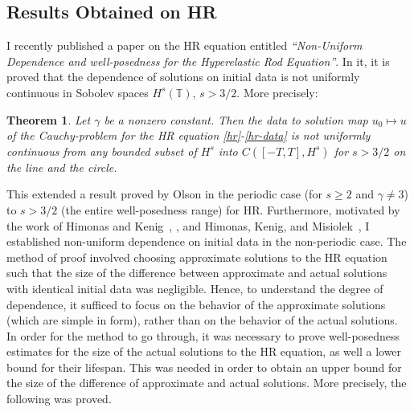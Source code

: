 \documentclass[12pt,reqno]{amsart}
\newcommand{\ci}{\mathbb{T}}
\newtheorem{theorem}{Theorem}
\begin{document}
%
%
\subsection{Results Obtained on HR} 
\label{ssec:weak-disp}
%
%
%
%
%
%
%
%
%
%
I recently published a paper on the HR equation entitled 
{\it ``Non-Uniform Dependence and well-posedness
for the
Hyperelastic Rod Equation''}. 
In it, it is proved that the dependence of
solutions on initial data is not uniformly continuous in Sobolev spaces
$H^s(\ci)$, $s>3/2$.  More precisely: 
\begin{theorem}
\label{hr-non-unif-dependence}
Let $\gamma$ be a nonzero constant. Then 
the data to solution map $u_{0} \mapsto u$ of the Cauchy-problem
for the HR equation
\eqref{hr}-\eqref{hr-data}
is not uniformly continuous
from any bounded subset of  $H^s$ into $C([-T, T], H^s)$
for $s>3/2$ on the line and the circle.
%
\end{theorem}
%
This extended a result proved by Olson 
\cite{Olson_2006_Non-uniform-dep} in the periodic
case (for $s\ge 2$ and $\gamma \ne 3$)  to  $s>3/2$ (the entire well-posedness
range) for HR\@. Furthermore, motivated by the work of Himonas and
Kenig~\cite{Himonas:2009fk},
 \cite{Himonas_2010_Non-uniform-dep-euler},
  and 
Himonas, Kenig, and Misiolek~\cite{Himonas_2010_Non-uniform-dep-per},
I established non-uniform dependence on initial data in the non-periodic case.
The method of proof involved choosing approximate solutions to the HR equation
such that the size of the difference between approximate and actual solutions
with identical initial data was negligible. Hence, to understand the degree of
dependence, it sufficed to focus on the behavior of the approximate solutions
(which are simple in form), rather than on the behavior of the actual solutions.
In order for the method to go through, it was necessary to prove well-posedness estimates
for the size of the actual solutions to the HR equation, as well a lower bound
for their lifespan. This was needed in order to obtain an upper bound for the
size of the difference of approximate and actual solutions. More precisely, 
the following was proved. 
%
\end{document}
